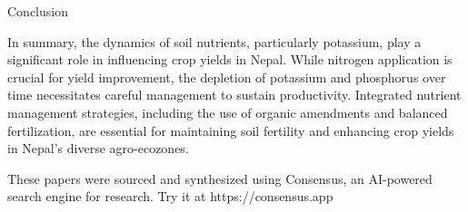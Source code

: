 \documentclass[a4paper,12pt]{article}
\begin{document}
Conclusion

In summary, the dynamics of soil nutrients, particularly potassium, play a significant role in influencing crop yields in Nepal. While nitrogen application is crucial for yield improvement, the depletion of potassium and phosphorus over time necessitates careful management to sustain productivity. Integrated nutrient management strategies, including the use of organic amendments and balanced fertilization, are essential for maintaining soil fertility and enhancing crop yields in Nepal's diverse agro-ecozones.

These papers were sourced and synthesized using Consensus, an AI-powered search engine for research. Try it at https://consensus.app



























\printbibliography
\end{document}
